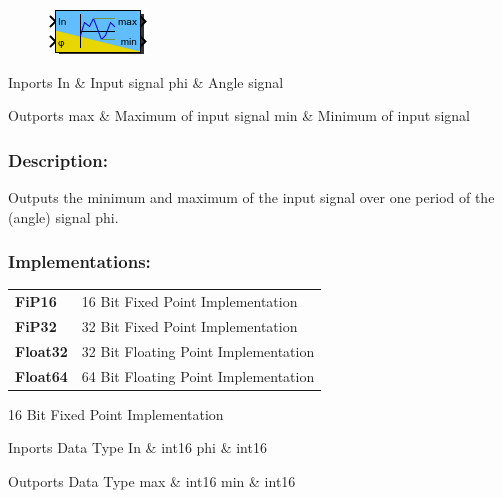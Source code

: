 \label{block:MinMaxPeriodic}
\begin{figure}[H]\includegraphics{MinMaxPeriodic}\end{figure} 

\begin{XtoCtabular}{Inports}
In & Input signal\tabularnewline
\hline
phi & Angle signal\tabularnewline
\hline
\end{XtoCtabular}


\begin{XtoCtabular}{Outports}
max & Maximum of input signal\tabularnewline
\hline
min & Minimum of input signal\tabularnewline
\hline
\end{XtoCtabular}

\subsubsection*{Description:}
Outputs the minimum and maximum of the input signal over one period of the (angle) signal phi.


\subsubsection*{Implementations:}
\begin{tabular}{l l}
\textbf{FiP16} & 16 Bit Fixed Point Implementation\tabularnewline
\textbf{FiP32} & 32 Bit Fixed Point Implementation\tabularnewline
\textbf{Float32} & 32 Bit Floating Point Implementation\tabularnewline
\textbf{Float64} & 64 Bit Floating Point Implementation\tabularnewline
\end{tabular}

\nopagebreak[0]

16 Bit Fixed Point Implementation

\begin{XtoCtabular}{Inports Data Type}
In & int16\tabularnewline
\hline
phi & int16\tabularnewline
\hline
\end{XtoCtabular}

\begin{XtoCtabular}{Outports Data Type}
max & int16\tabularnewline
\hline
min & int16\tabularnewline
\hline
\end{XtoCtabular}

